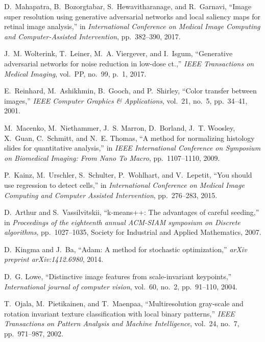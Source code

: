 \documentclass[journal]{IEEEtran}
\begin{document}
\begin{thebibliography}{10}
D.~Mahapatra, B.~Bozorgtabar, S.~Hewavitharanage, and R.~Garnavi, ``Image super
  resolution using generative adversarial networks and local saliency maps for
  retinal image analysis,'' in {\em International Conference on Medical Image
  Computing and Computer-Assisted Intervention}, pp.~382--390, 2017.

J.~M. Wolterink, T.~Leiner, M.~A. Viergever, and I.~Isgum, ``Generative
  adversarial networks for noise reduction in low-dose ct.,'' {\em IEEE
  Transactions on Medical Imaging}, vol.~PP, no.~99, p.~1, 2017.

E.~Reinhard, M.~Ashikhmin, B.~Gooch, and P.~Shirley, ``Color transfer between
  images,'' {\em IEEE Computer Graphics \& Applications}, vol.~21, no.~5,
  pp.~34--41, 2001.

M.~Macenko, M.~Niethammer, J.~S. Marron, D.~Borland, J.~T. Woosley, X.~Guan,
  C.~Schmitt, and N.~E. Thomas, ``A method for normalizing histology slides for
  quantitative analysis,'' in {\em IEEE International Conference on Symposium
  on Biomedical Imaging: From Nano To Macro}, pp.~1107--1110, 2009.

P.~Kainz, M.~Urschler, S.~Schulter, P.~Wohlhart, and V.~Lepetit, ``You should
  use regression to detect cells,'' in {\em International Conference on Medical
  Image Computing and Computer Assisted Intervention}, pp.~276--283, 2015.

D.~Arthur and S.~Vassilvitskii, ``k-means++: The advantages of careful
  seeding,'' in {\em Proceedings of the eighteenth annual ACM-SIAM symposium on
  Discrete algorithms}, pp.~1027--1035, Society for Industrial and Applied
  Mathematics, 2007.

D.~Kingma and J.~Ba, ``Adam: A method for stochastic optimization,'' {\em arXiv
  preprint arXiv:1412.6980}, 2014.

D.~G. Lowe, ``Distinctive image features from scale-invariant keypoints,'' {\em
  International journal of computer vision}, vol.~60, no.~2, pp.~91--110, 2004.

T.~Ojala, M.~Pietikainen, and T.~Maenpaa, ``Multiresolution gray-scale and
  rotation invariant texture classification with local binary patterns,'' {\em
  IEEE Transactions on Pattern Analysis and Machine Intelligence}, vol.~24,
  no.~7, pp.~971--987, 2002.

\end{thebibliography}
\end{document}
